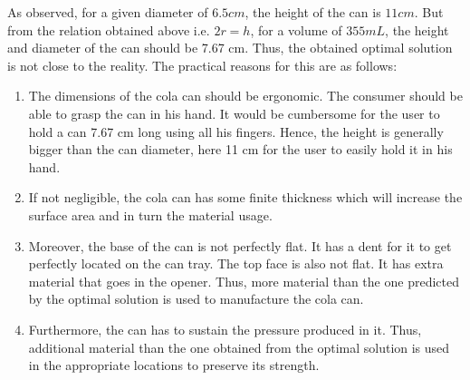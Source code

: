 \documentclass[12pt]{article}
\begin{document}
As observed, for a given diameter of $6.5 cm$, the height of the can is $11 cm$. But from the relation obtained above i.e. $2r = h$, for a volume of $355 mL$, the height and diameter of the can should be 7.67 cm. Thus, the obtained optimal solution is not close to the reality. The practical reasons for this are as follows:
\begin{enumerate}
\item The dimensions of the cola can should be ergonomic. The consumer should be able to grasp the can in his hand. It would be cumbersome for the user to hold a can 7.67 cm long using all his fingers. Hence, the height is generally bigger than the can diameter, here 11 cm for the user to easily hold it in his hand. 
\item If not negligible, the cola can has some finite thickness which will increase the surface area and in turn the material usage. 
\item Moreover, the base of the can is not perfectly flat. It has a dent for it to get perfectly located on the can tray. The top face is also not flat. It has extra material that goes in the opener. Thus, more material than the one predicted by the optimal solution is used to manufacture the cola can.
\item Furthermore, the can has to sustain the pressure produced in it. Thus, additional material than the one obtained from the optimal solution is used in the appropriate locations to preserve its strength.
\end{enumerate}
\end{document}
